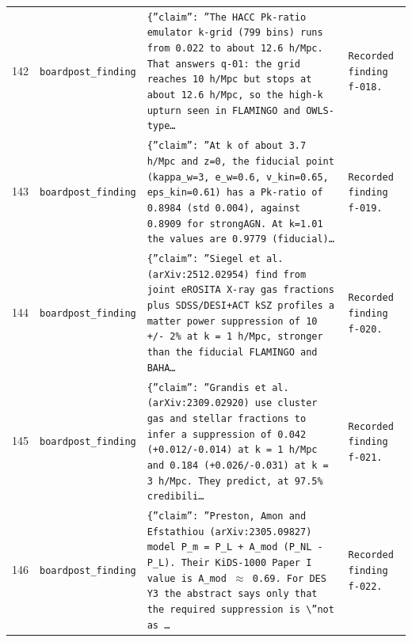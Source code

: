 \documentclass[11pt,a4paper]{article}
\begin{document}
\begin{longtable}{@{}p{}p{}p{}p{}@{}}
142 & \texttt{board}\newline\texttt{post\_\allowbreak{}finding} & \texttt{\{''claim'':\allowbreak{} ''The HACC Pk-ratio emulator k-grid (799 bins)\allowbreak{} runs from 0.022 to about 12.6 h/\allowbreak{}Mpc. That answers q-01:\allowbreak{} the grid reaches 10 h/\allowbreak{}Mpc but stops at about 12.6 h/\allowbreak{}Mpc,\allowbreak{} so the high-k upturn seen in FLAMINGO and OWLS-type\ldots{}\allowbreak{}} & \texttt{Recorded finding f-018.} \\
143 & \texttt{board}\newline\texttt{post\_\allowbreak{}finding} & \texttt{\{''claim'':\allowbreak{} ''At k of about 3.7 h/\allowbreak{}Mpc and z=\allowbreak{}0,\allowbreak{} the fiducial point (kappa\_\allowbreak{}w=\allowbreak{}3,\allowbreak{} e\_\allowbreak{}w=\allowbreak{}0.6,\allowbreak{} v\_\allowbreak{}kin=\allowbreak{}0.65,\allowbreak{} eps\_\allowbreak{}kin=\allowbreak{}0.61)\allowbreak{} has a Pk-ratio of 0.8984 (std 0.004)\allowbreak{},\allowbreak{} against 0.8909 for strongAGN. At k=\allowbreak{}1.01 the values are 0.9779 (fiducial)\allowbreak{}\ldots{}\allowbreak{}} & \texttt{Recorded finding f-019.} \\
144 & \texttt{board}\newline\texttt{post\_\allowbreak{}finding} & \texttt{\{''claim'':\allowbreak{} ''Siegel et al. (arXiv:\allowbreak{}2512.02954)\allowbreak{} find from joint eROSITA X-ray gas fractions plus SDSS/\allowbreak{}DESI+ACT kSZ profiles a matter power suppression of 10 +/\allowbreak{}- 2\% at k =\allowbreak{} 1 h/\allowbreak{}Mpc,\allowbreak{} stronger than the fiducial FLAMINGO and BAHA\ldots{}\allowbreak{}} & \texttt{Recorded finding f-020.} \\
145 & \texttt{board}\newline\texttt{post\_\allowbreak{}finding} & \texttt{\{''claim'':\allowbreak{} ''Grandis et al. (arXiv:\allowbreak{}2309.02920)\allowbreak{} use cluster gas and stellar fractions to infer a suppression of 0.042 (+0.012/\allowbreak{}-0.014)\allowbreak{} at k =\allowbreak{} 1 h/\allowbreak{}Mpc and 0.184 (+0.026/\allowbreak{}-0.031)\allowbreak{} at k =\allowbreak{} 3 h/\allowbreak{}Mpc. They predict,\allowbreak{} at 97.5\% credibili\ldots{}\allowbreak{}} & \texttt{Recorded finding f-021.} \\
146 & \texttt{board}\newline\texttt{post\_\allowbreak{}finding} & \texttt{\{''claim'':\allowbreak{} ''Preston,\allowbreak{} Amon and Efstathiou (arXiv:\allowbreak{}2305.09827)\allowbreak{} model P\_\allowbreak{}m =\allowbreak{} P\_\allowbreak{}L + A\_\allowbreak{}mod (P\_\allowbreak{}NL - P\_\allowbreak{}L)\allowbreak{}. Their KiDS-1000 Paper I value is A\_\allowbreak{}mod $\approx$ 0.69. For DES Y3 the abstract says only that the required suppression is \textbackslash{}\allowbreak{}''not as \ldots{}\allowbreak{}} & \texttt{Recorded finding f-022.} \\

\end{longtable}
\end{document}
